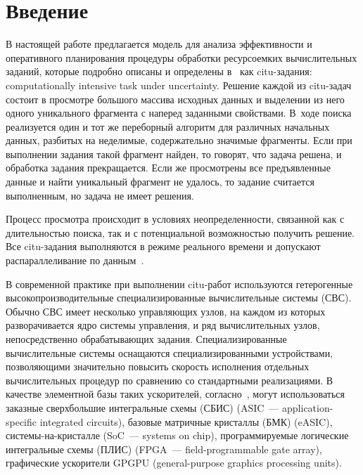       \begin{multicols}{2}

            \label{st\stat}

\section{Введение}

В настоящей работе предлагается модель для анализа эффективности
и оперативного планирования процедуры обработки ресурсоемких
вы\-чис\-ли\-тель\-ных заданий, которые подробно описаны и определены в~\cite{Prep11} 
как citu-за\-да\-ния: computationally intensive task under
uncertainty.  Решение каж\-дой из citu-за\-дач  состоит в просмотре
большого массива исходных данных и выделении из него одного
уникального фрагмента с наперед заданными свойствами. В~ходе  поиска
реализуется один и тот же переборный алгоритм для различных
начальных данных, разбитых  на неделимые, содержательно значимые
фрагменты. Если при выполнении задания такой фрагмент найден, то
говорят, что задача решена, и обработка задания прекращается.  Если
же  просмотрены  все  предъявленные данные и  найти уникальный
фрагмент не удалось, то задание считается выполненным, но задача не
имеет решения.

Процесс просмотра происходит в условиях неопределенности, связанной
как с длительностью поиска, так и с потенциальной возможностью
получить решение. Все citu-за\-да\-ния выполняются в режиме реального
времени и  допускают распараллеливание по данным~\cite{Sour}.

В современной практике при выполнении citu-ра\-бот используются
гетерогенные высокопроизводительные специализированные
вычислительные сис\-те\-мы (СВС). Обычно СВС имеет несколько управ\-ля\-ющих
узлов, на каж\-дом из которых разворачивается ядро сис\-те\-мы управ\-ле\-ния,
и ряд вы\-чис\-ли\-тель\-ных узлов, непосредственно обрабатыва\-ющих задания.
Специализированные
вычислительные сис\-те\-мы оснащаются  специализированными устройствами, позволяющими
значительно повысить скорость исполнения отдельных вы\-чис\-ли\-тель\-ных
процедур по сравнению со стандартными реализациями. В качестве
элементной базы таких ускорителей, согласно~\cite{Kal}, могут
использоваться заказные сверхбольшие интегральные схемы (СБИС) (ASIC~--- application-specific
integrated circuits), базовые мат\-рич\-ные крис\-тал\-лы (БМК) (\mbox{eASIC}),
сис\-те\-мы-на-крис\-тал\-ле (SoC~--- systems on chip), программируемые логические интегральные схемы (ПЛИС) 
(FPGA~--- field-programmable gate array), графические ускорители
GPGPU (general-purpose graphics processing units).


\end{multicols}
